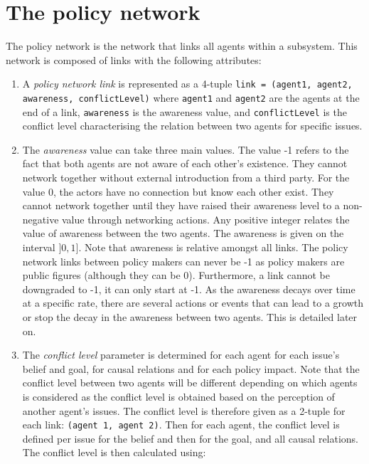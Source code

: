 \documentclass[11pt]{article}
\begin{document}
\section{The policy network}
\label{sec:policyNetwork}

The policy network is the network that links all agents within a subsystem. This network is composed of links with the following attributes: 

\begin{enumerate}
\item A \emph{policy network link} is represented as a 4-tuple \texttt{link = (agent1, agent2, awareness, conflictLevel)} where \texttt{agent1} and \texttt{agent2} are the agents at the end of a link, \texttt{awareness} is the awareness value, and \texttt{conflictLevel} is the conflict level characterising the relation between two agents for specific issues.

\item The \emph{awareness} value can take three main values. The value -1 refers to the fact that both agents are not aware of each other's existence. They cannot network together without external introduction from a third party. For the value 0, the actors have no connection but know each other exist. They cannot network together until they have raised their awareness level to a non-negative value through networking actions. Any positive integer relates the value of awareness between the two agents. The awareness is given on the interval $]0,1]$. Note that awareness is relative amongst all links. The policy network links between policy makers can never be -1 as policy makers are public figures (although they can be 0). Furthermore, a link cannot be downgraded to -1, it can only start at -1. As the awareness decays over time at a specific rate, there are several actions or events that can lead to a growth or stop the decay in the awareness between two agents. This is detailed later on.

\item The \emph{conflict level} parameter is determined for each agent for each issue's belief and goal, for causal relations and for each policy impact. Note that the conflict level between two agents will be different depending on which agents is considered as the conflict level is obtained based on the perception of another agent's issues. The conflict level is therefore given as a 2-tuple for each link: \texttt{(agent 1, agent 2)}. Then for each agent, the conflict level is defined per issue for the belief and then for the goal, and all causal relations. The conflict level is then calculated using:


\end{enumerate}
\end{document}
